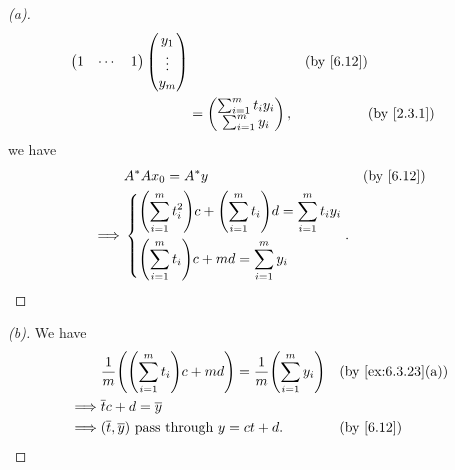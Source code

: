 \begin{proof}[(a)]
\begin{align*}
\begin{pmatrix}
                    1   & \cdots & 1
                  \end{pmatrix} \begin{pmatrix}
                                  y_1    \\
                                  \vdots \\
                                  y_m
                                \end{pmatrix}                                                    &  & \by{6.12} \\
              & = \begin{pmatrix}
                    \sum_{i = 1}^m t_i y_i \\
                    \sum_{i = 1}^m y_i
                  \end{pmatrix},                                                        &  & \by{2.3.1}
  \end{align*}
  we have
  \begin{align*}
             & A^* A x_0 = A^* y                                                                                         &  & \by{6.12} \\
    \implies & \begin{dcases}
                 \pa{\sum_{i = 1}^m t_i^2} c + \pa{\sum_{i = 1}^m t_i} d = \sum_{i = 1}^m t_i y_i \\
                 \pa{\sum_{i = 1}^m t_i} c + md = \sum_{i = 1}^m y_i
               \end{dcases}.
  \end{align*}
\end{proof}

\begin{proof}[(b)]
  We have
  \begin{align*}
             & \dfrac{1}{m} \pa{\pa{\sum_{i = 1}^m t_i} c + md} = \dfrac{1}{m} \pa{\sum_{i = 1}^m y_i} &  & \by{ex:6.3.23}[a] \\
    \implies & \overline{t} c + d = \overline{y}                                                                              \\
    \implies & (\overline{t}, \overline{y}) \text{ pass through } y = ct + d.                          &  & \by{6.12}
  \end{align*}
\end{proof}

